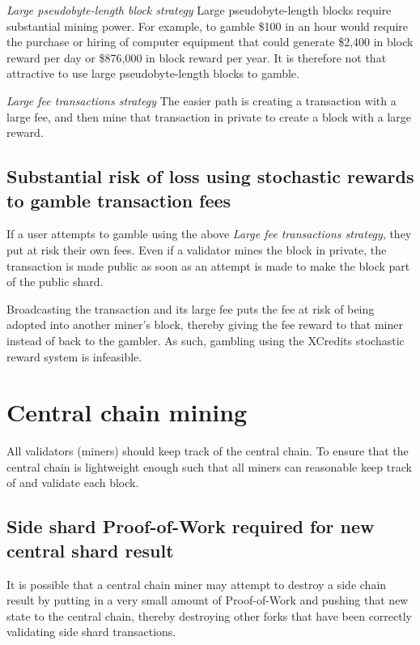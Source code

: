 \documentclass[a4paper,12pt]{article}
\begin{document}
\textit{Large pseudobyte-length block strategy}
Large pseudobyte-length blocks require substantial mining power. For example, to gamble \$100 in an hour would require the purchase or hiring of computer equipment that could generate \$2,400 in block reward per day or \$876,000 in block reward per year. It is therefore not that attractive to use large pseudobyte-length blocks to gamble. 

\textit{Large fee transactions strategy}
The easier path is creating a transaction with a large fee, and then mine that transaction in private to create a block with a large reward. 


\subsection{Substantial risk of loss using stochastic rewards to gamble transaction fees}
If a user attempts to gamble using the above \textit{Large fee transactions strategy}, they put at risk their own fees. Even if a validator mines the block in private, the transaction is made public as soon as an attempt is made to make the block part of the public shard. 

Broadcasting the transaction and its large fee puts the fee at risk of being adopted into another miner's block, thereby giving the fee reward to that miner instead of back to the gambler. As such, gambling using the XCredits stochastic reward system is infeasible.
















\section{Central chain mining}

All validators (miners) should keep track of the central chain. To ensure that the central chain is lightweight enough such that all miners can reasonable keep track of and validate each block.

\subsection{Side shard Proof-of-Work required for new central shard result}
It is possible that a central chain miner may attempt to destroy a side chain result by putting in a very small amount of Proof-of-Work and pushing that new state to the central chain, thereby destroying other forks that have been correctly validating side shard transactions.
\end{document}
